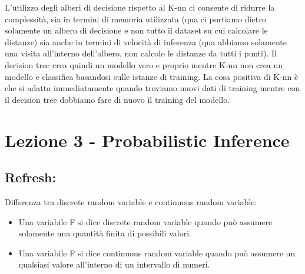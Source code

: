 \documentclass[14pt]{extreport}
\begin{document}
L’utilizzo degli alberi di decisione rispetto al K-nn ci consente di ridurre la complessità, sia in termini di memoria utilizzata (qua ci portiamo
dietro solamente un albero di decisione e non tutto il dataset su cui calcolare le distanze) sia anche in termini di velocità di inferenza (qua
abbiamo solamente una visita all’interno dell’albero, non calcolo le distanze da tutti i punti). Il decision tree crea quindi un modello vero e
proprio mentre K-nn non crea un modello e classifica basandosi sulle istanze di training. La cosa positiva di K-nn è che si adatta immediatamente
quando troviamo nuovi dati di training mentre con il decision tree dobbiamo fare di nuovo il training del modello.













\chapter{Lezione 3 - Probabilistic Inference}

\section{Refresh: } Differenza tra discrete random variable e continuous random variable:
\begin{itemize}
	\item Una variabile F si dice discrete random variable quando può assumere solamente una quantità finita di possibili valori.
	\item Una variabile F si dice continuous random variable quando può assumere un qualsiasi valore all'interno di un intervallo di numeri.
\end{itemize}
\end{document}
